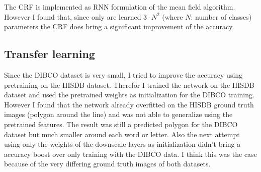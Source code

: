 \documentclass[a4paper, 9pt, twocolumn]{extarticle}
\begin{document}
The CRF is implemented as RNN formulation of the mean field algorithm. However I
found that, since only are learned $3\cdot N^2$ (where $N$: number of classes)
parameters the CRF does bring a significant improvement of the accuracy.

\subsection*{Transfer learning}

Since the DIBCO dataset is very small, I tried to improve the accuracy using
pretraining on the HISDB dataset. Therefor I trained the network on the HISDB
dataset and used the pretrained weights as initialization for the DIBCO
training. However I found that the network already overfitted on the HISDB
ground truth images (polygon around the line) and was not able to generalize
using the pretrained features. The result was still a predicted polygon for the
DIBCO dataset but much smaller around each word or letter. Also the next attempt
using only the weights of the downscale layers as initialization didn't bring a
accuracy boost over only training with the DIBCO data. I think this was the case
because of the very differing ground truth images of both datasets.


\small

\end{document}

